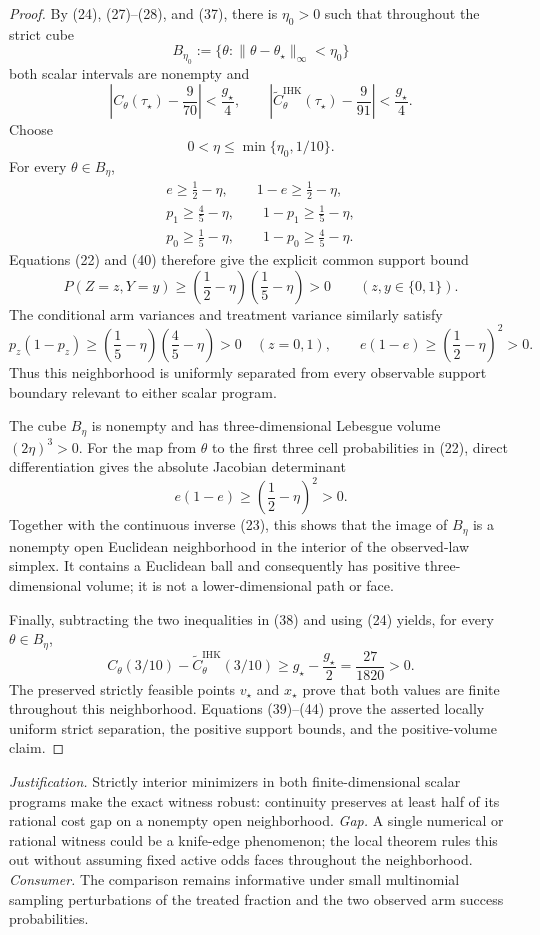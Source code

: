 \documentclass{article}
\begin{document}
\begin{proof}
By (24), (27)--(28), and (37), there is \(\eta_0>0\) such that throughout the strict cube
\[
B_{\eta_0}:=\{\theta:\|\theta-\theta_\star\|_\infty<\eta_0\}
\]
both scalar intervals are nonempty and
\[
\left|C_\theta(\tau_\star)-\frac9{70}\right|<\frac{g_\star}{4},
\qquad
\left|\widetilde C^{\mathrm{IHK}}_\theta(\tau_\star)-\frac9{91}\right|<\frac{g_\star}{4}.
\tag{38}
\]
Choose
\[
0<\eta\leq\min\{\eta_0,1/10\}.
\tag{39}
\]
For every \(\theta\in B_\eta\),
\[
\begin{gathered}
 e\geq\frac12-\eta,\qquad 1-e\geq\frac12-\eta,\\
p_1\geq\frac45-\eta,\qquad 1-p_1\geq\frac15-\eta,\\
p_0\geq\frac15-\eta,\qquad 1-p_0\geq\frac45-\eta.
\end{gathered}
\tag{40}
\]
Equations (22) and (40) therefore give the explicit common support bound
\[
P(Z=z,Y=y)
\geq\left(\frac12-\eta\right)
       \left(\frac15-\eta\right)>0
\qquad(z,y\in\{0,1\}).
\tag{41}
\]
The conditional arm variances and treatment variance similarly satisfy
\[
p_z(1-p_z)
\geq\left(\frac15-\eta\right)
       \left(\frac45-\eta\right)>0
\quad(z=0,1),
\qquad
e(1-e)\geq\left(\frac12-\eta\right)^2>0.
\tag{42}
\]
Thus this neighborhood is uniformly separated from every observable support boundary relevant to either scalar program.

The cube \(B_\eta\) is nonempty and has three-dimensional Lebesgue volume \((2\eta)^3>0\).  For the map from \(\theta\) to the first three cell probabilities in (22), direct differentiation gives the absolute Jacobian determinant
\[
e(1-e)\geq\left(\frac12-\eta\right)^2>0.
\tag{43}
\]
Together with the continuous inverse (23), this shows that the image of \(B_\eta\) is a nonempty open Euclidean neighborhood in the interior of the observed-law simplex.  It contains a Euclidean ball and consequently has positive three-dimensional volume; it is not a lower-dimensional path or face.

Finally, subtracting the two inequalities in (38) and using (24) yields, for every \(\theta\in B_\eta\),
\[
C_\theta(3/10)-\widetilde C^{\mathrm{IHK}}_\theta(3/10)
\geq g_\star-\frac{g_\star}{2}
=\frac{27}{1820}>0.
\tag{44}
\]
The preserved strictly feasible points \(v_\star\) and \(x_\star\) prove that both values are finite throughout this neighborhood.  Equations (39)--(44) prove the asserted locally uniform strict separation, the positive support bounds, and the positive-volume claim.
\end{proof}
\par\smallskip\noindent \textit{Justification.} Strictly interior minimizers in both finite-dimensional scalar programs make the exact witness robust: continuity preserves at least half of its rational cost gap on a nonempty open neighborhood. \textit{Gap.} A single numerical or rational witness could be a knife-edge phenomenon; the local theorem rules this out without assuming fixed active odds faces throughout the neighborhood. \textit{Consumer.} The comparison remains informative under small multinomial sampling perturbations of the treated fraction and the two observed arm success probabilities.
\end{document}
